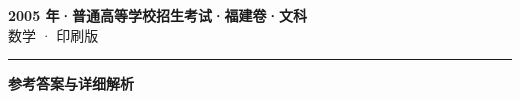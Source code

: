 \documentclass[zihao=5, a4paper]{ctexart}
\begin{document}
\begin{center}
  {\Large\bfseries 2005 年·普通高等学校招生考试·福建卷·文科}\\[4pt]
  {\large 数学 · 印刷版}
\end{center}
\medskip
{}

\par\bigskip\hrule\bigskip
{}
\begin{center}{\large\bfseries 参考答案与详细解析}\end{center}
\smallskip

\end{document}
